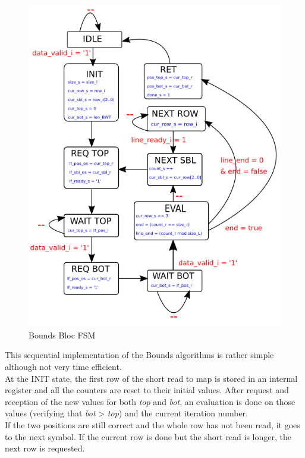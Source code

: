 \begin{minipage}[t]{0.45\textwidth}
\begin{figure}[H]
    \centering
    \hspace*{-20mm}\includegraphics[scale = 0.5]{Figures/BOUNDS_FSM.png}
    \caption{Bounds Bloc FSM}
    \label{fig:bounds_fsm}
\end{figure}
\end{minipage}
\hfill
\begin{minipage}[t]{0.4\textwidth}
This sequential implementation of the Bounds algorithms is rather simple although not very time efficient. \\

At the INIT state, the first row of the short read to map is stored in an internal register and all the counters are reset to their initial values. After request and reception of the new values for both \textit{top} and \textit{bot}, an evaluation is done on those values (verifying that \textit{bot} > \textit{top}) and the current iteration number. \\
If the two positions are still correct and the whole row has not been read, it goes to the next symbol. If the current row is done but the short read is longer, the next row is requested.
\end{minipage}

